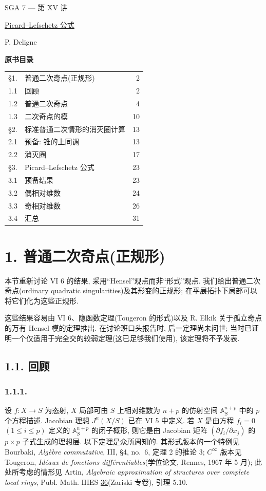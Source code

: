 \clearpage
\ExposeTOC
\begin{center}
{\large SGA 7 --- 第 XV 讲}\par
\vspace{2em}
{\Large\underline{Picard--Lefschetz 公式}}\par
\vspace{1.5em}
{\large P. Deligne}
\end{center}

\medskip
\noindent\textbf{原书目录}
\begin{center}
\begin{tabular}{@{}llr@{}}
\S1. & 普通二次奇点(正规形) & 2\\
1.1 & 回顾 & 2\\
1.2 & 普通二次奇点 & 4\\
1.3 & 二次奇点的模 & 10\\
\S2. & 标准普通二次情形的消灭圈计算 & 13\\
2.1 & 预备: 锥的上同调 & 13\\
2.2 & 消灭圈 & 17\\
\S3. & Picard--Lefschetz 公式 & 23\\
3.1 & 预备结果 & 23\\
3.2 & 偶相对维数 & 24\\
3.3 & 奇相对维数 & 26\\
3.4 & 汇总 & 31
\end{tabular}
\end{center}

\section*{1. 普通二次奇点(正规形)}

本节重新讨论 VI 6 的结果, 采用“Hensel”观点而非“形式”观点. 我们给出普通二次奇点(ordinary quadratic singularities)及其形变的正规形; 在平展拓扑下局部可以将它们化为这些正规形.

这些结果容易由 VI 6、隐函数定理(Tougeron 的形式)以及 R. Elkik 关于孤立奇点的万有 Hensel 模的定理推出. 在讨论班口头报告时, 后一定理尚未问世; 当时已证明一个仅适用于完全交的较弱定理(这已足够我们使用), 该定理将不予发表.

\subsection*{1.1. 回顾}

\subsubsection*{1.1.1.}
设 $f:X\longrightarrow S$ 为态射, $X$ 局部可由 $S$ 上相对维数为 $n+p$ 的仿射空间 $\mathbb A_S^{n+p}$ 中的 $p$ 个方程描述. Jacobian 理想 $J^n(X/S)$ 已在 VI 5 中定义. 若 $X$ 是由方程 $f_i=0$ $(1\leq i\leq p)$ 定义的 $\mathbb A_S^{n+p}$ 的闭子概形, 则它是由 Jacobian 矩阵 $(\partial f_i/\partial x_j)$ 的 $p\times p$ 子式生成的理想层. 以下定理是众所周知的. 其形式版本的一个特例见 Bourbaki, \emph{Alg\`ebre commutative}, III, \S4, no.~6, 定理 2 的推论 3; $C^\infty$ 版本见 Tougeron, \emph{Id\'eaux de fonctions diff\'erentiables}(学位论文, Rennes, 1967 年 5 月); 此处所考虑的情形见 Artin, \emph{Algebraic approximation of structures over complete local rings}, Publ. Math. IHES \underline{36}(Zariski 专卷), 引理 5.10.

